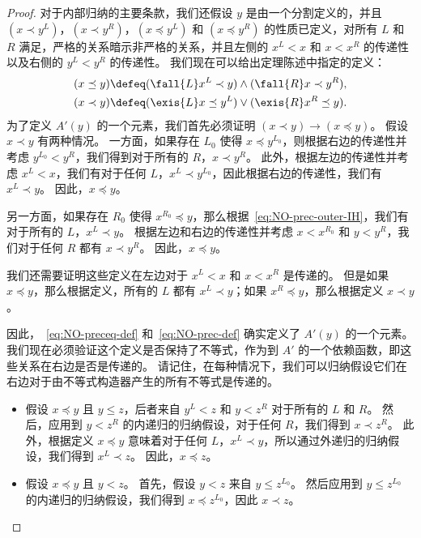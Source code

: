 \begin{proof}
  对于内部归纳的主要条款，我们还假设 $y$ 是由一个分割定义的，并且 $(x\prec y^L)$，$(x\prec y^R)$，$(x\preceq y^L)$ 和 $(x\preceq y^R)$ 的性质已定义，对所有 $L$ 和 $R$ 满足，严格的关系暗示非严格的关系，并且左侧的 $x^L<x$ 和 $x<x^R$ 的传递性以及右侧的 $y^L<y^R$ 的传递性。
  我们现在可以给出定理陈述中指定的定义：
  \begin{align}
  (x\preceq y) &\defeq
  (\fall{L} x^L\prec y) \land (\fall{R} x\prec y^R), \label{eq:NO-preceq-def}\\
  (x\prec y) &\defeq
  (\exis{L} x\preceq y^L) \lor (\exis{R} x^R \preceq y).\label{eq:NO-prec-def}
  \end{align}
  为了定义 $A'(y)$ 的一个元素，我们首先必须证明 $(x\prec y) \to (x\preceq y)$。
  假设 $x\prec y$ 有两种情况。
  一方面，如果存在 $L_0$ 使得 $x\preceq y^{L_0}$，则根据右边的传递性并考虑 $y^{L_0}<y^R$，我们得到对于所有的 $R$，$x\prec y^R$。
  此外，根据左边的传递性并考虑 $x^L<x$，我们有对于任何 $L$，$x^L \prec y^{L_0}$，因此根据右边的传递性，我们有 $x^L\prec y$。
  因此，$x\preceq y$。

  另一方面，如果存在 $R_0$ 使得 $x^{R_0}\preceq y$，那么根据~\eqref{eq:NO-prec-outer-IH}，我们有对于所有的 $L$，$x^L \prec y$。
  根据左边和右边的传递性并考虑 $x<x^{R_0}$ 和 $y<y^R$，我们对于任何 $R$ 都有 $x\prec y^R$。
  因此，$x\preceq y$。

  我们还需要证明这些定义在左边对于 $x^L<x$ 和 $x<x^R$ 是传递的。
  但是如果 $x\preceq y$，那么根据定义，所有的 $L$ 都有 $x^L\prec y$；如果 $x^R\preceq y$，那么根据定义 $x\prec y$。

  因此，~\eqref{eq:NO-preceq-def} 和~\eqref{eq:NO-prec-def} 确实定义了 $A'(y)$ 的一个元素。
  我们现在必须验证这个定义是否保持了不等式，作为到 $A'$ 的一个依赖函数，即这些关系在右边是否是传递的。
  请记住，在每种情况下，我们可以归纳假设它们在右边对于由不等式构造器产生的所有不等式是传递的。
  \begin{itemize}
    \item 假设 $x\preceq y$ 且 $y\le z$，后者来自 $y^L<z$ 和 $y<z^R$ 对于所有的 $L$ 和 $R$。
    然后，应用到 $y<z^R$ 的内递归的归纳假设，对于任何 $R$，我们得到 $x\prec z^R$。
    此外，根据定义 $x\preceq y$ 意味着对于任何 $L$，$x^L \prec y$，所以通过外递归的归纳假设，我们得到 $x^L \prec z$。
    因此，$x\preceq z$。
    \item 假设 $x\preceq y$ 且 $y<z$。
    首先，假设 $y<z$ 来自 $y\le z^{L_0}$。
    然后应用到 $y\le z^{L_0}$ 的内递归的归纳假设，我们得到 $x \preceq z^{L_0}$，因此 $x\prec z$。


\end{itemize}
\end{proof}
